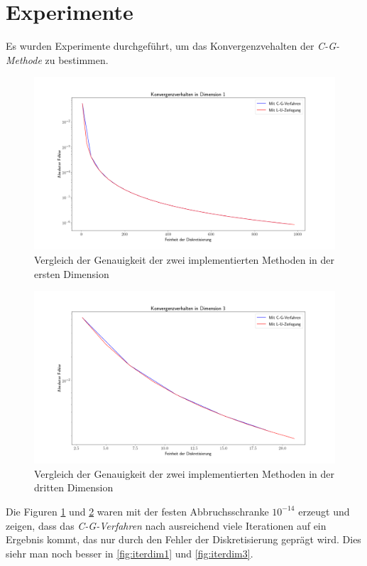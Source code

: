 \documentclass[smallheadings]{scrartcl}
\numberwithin{equation}{section}
\begin{document}
\section{Experimente}

Es wurden Experimente durchgeführt, um das Konvergenzvehalten der \textit{C-G-Methode} zu bestimmen.

\begin{figure}[H]
	\centering
	\includegraphics[width=\linewidth]{Bilder/VergleichDim1}
	\caption{Vergleich der Genauigkeit der zwei implementierten Methoden in der ersten Dimension}
	\label{fig:vergleichdim1}
\end{figure}

\begin{figure}[H]
	\centering
	\includegraphics[width=\linewidth]{Bilder/VergleichDim3}
	\caption{Vergleich der Genauigkeit der zwei implementierten Methoden in der dritten Dimension}
	\label{fig:vegleichdim3}
\end{figure}

Die Figuren \ref{fig:vergleichdim1} und \ref{fig:vegleichdim3} waren mit der festen Abbruchsschranke $10^{-14 }$ erzeugt und zeigen, dass das  \textit{C-G-Verfahren} nach ausreichend viele Iterationen auf ein Ergebnis kommt, das nur durch den Fehler der Diskretisierung geprägt wird. Dies siehr man noch besser in \ref{fig:iterdim1} und \ref{fig:iterdim3}.
\end{document}
